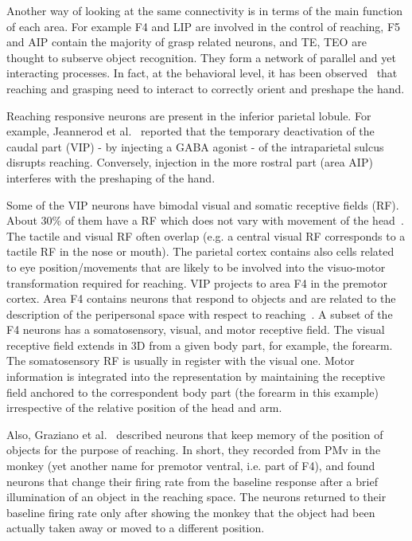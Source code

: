 Another way of looking at the same connectivity is in terms of the main 
function of each area. For example F4 and LIP are involved in the control of 
reaching, F5 and AIP contain the majority of grasp related neurons, 
and TE, TEO are thought to subserve object recognition. They form a network 
of parallel and yet interacting processes. In fact, at the behavioral level, it has 
been observed~\cite{jeannerod-arbib-rizzolatti-sakata-1995} that reaching and 
grasping need to interact to correctly orient and preshape the hand.

Reaching responsive neurons are present in the inferior parietal lobule. For 
example, Jeannerod et al.~\cite{jeannerod-arbib-rizzolatti-sakata-1995} reported 
that the temporary deactivation of the caudal part (VIP) - by injecting a GABA 
agonist - of the intraparietal sulcus 
disrupts reaching. Conversely, injection in the more rostral part (area AIP) 
interferes with the
preshaping of the hand. 

Some of the VIP neurons have bimodal visual and somatic receptive 
fields (RF). About 30\% of them have a RF which does not vary with 
movement of the head~\cite{rizzolatti-fogassi-gallese-1997}. The tactile and 
visual RF often overlap (e.g. a central visual 
RF corresponds to a tactile RF in the nose or mouth). The parietal cortex contains 
also cells related to eye position/movements that are likely to be involved into 
the visuo-motor transformation required for reaching. VIP projects to area 
F4 in the premotor cortex. Area F4 contains neurons that respond to objects and 
are related to the description of the peripersonal space with respect to reaching~\cite{graziano-hu-gross-1997,fogassi96coding}. A subset of the F4 neurons 
has a somatosensory, visual, and motor receptive field. The visual receptive 
field extends in 3D from a given body part, for example, the forearm. The somatosensory RF
is usually in register with the visual one. Motor information
is integrated into the representation by maintaining the receptive
field anchored to the correspondent body part (the forearm in this
example) irrespective of the relative position of the head and arm.

Also, Graziano et al.~\cite{graziano-cooke-taylor-2000} described neurons that keep 
memory of the position of objects for the purpose of reaching. In short, they 
recorded from PMv in the monkey (yet another name for premotor ventral, i.e. part 
of F4), and found neurons that change their firing rate from the baseline response 
after a brief illumination of an object in the reaching space. The neurons returned 
to their baseline firing rate only after showing the monkey that the object had been 
actually taken away or moved to a different position.

